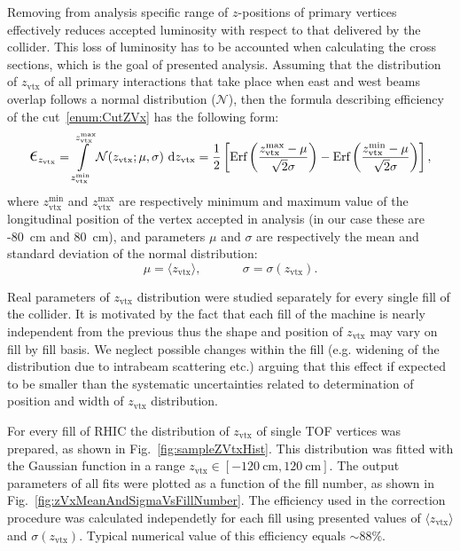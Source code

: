 Removing from analysis specific range of $z$-positions of primary vertices effectively reduces accepted luminosity with respect to that delivered by the collider. This loss of luminosity has to be accounted when calculating the cross sections, which is the goal of presented analysis. Assuming that the distribution of $z_{\text{vtx}}$ of all primary interactions that take place when east and west beams overlap follows a normal distribution ($\mathcal{N}$), then the formula describing efficiency of the cut~\ref{enum:CutZVx} has the following form:
\begin{equation}\label{eq:zVtxCutEff}
 \mbox{\LARGE$\epsilon$}_{z_{\text{vtx}}} = \int\limits_{z_{\text{vtx}}^{\text{min}}}^{z_{\text{vtx}}^{\text{max}}} \mathcal{N}(z_{\text{vtx}}; \mu, \sigma)~\text{d}z_{\text{vtx}} = \frac{1}{2}\left[ \text{Erf}\left(\frac{z_{\text{vtx}}^{\text{max}} - \mu}{\sqrt{2}\sigma}\right) - \text{Erf}\left(\frac{z_{\text{vtx}}^{\text{min}} - \mu}{\sqrt{2}\sigma}\right) \right],
\end{equation}
where $z_{\text{vtx}}^{\text{min}}$ and $z_{\text{vtx}}^{\text{max}}$ are respectively minimum and maximum value of the longitudinal position of the vertex accepted in analysis (in our case these are -80~cm and 80~cm), and parameters $\mu$ and $\sigma$ are respectively the mean and standard deviation of the normal distribution:
\[\mu = \langle z_{\text{vtx}}\rangle,~~~~~~~~~~~~~~~\sigma = \sigma(z_{\text{vtx}}).\]

Real parameters of $z_{\text{vtx}}$ distribution were studied separately for every single fill of the collider. It is motivated by the fact that each fill of the machine is nearly independent from the previous thus the shape and position of $z_{\text{vtx}}$ may vary on fill by fill basis. We neglect possible changes within the fill (e.g. widening of the distribution due to intrabeam scattering etc.) arguing that this effect if expected to be smaller than the systematic uncertainties related to determination of position and width of $z_{\text{vtx}}$ distribution.

For every fill of RHIC the distribution of $z_{\text{vtx}}$ of single TOF vertices was prepared, as shown in Fig.~\ref{fig:sampleZVtxHist}. This distribution was fitted with the Gaussian function in a range $z_{\text{vtx}}\in[-120~\text{cm}, 120~\text{cm}]$. The output parameters of all fits were plotted as a function of the fill number, as shown in Fig.~\ref{fig:zVxMeanAndSigmaVsFillNumber}. The efficiency used in the correction procedure was calculated independetly for each fill using presented values of $\langle z_{\text{vtx}}\rangle$ and $\sigma(z_{\text{vtx}})$. Typical numerical value of this efficiency equals $\sim88\%$.

